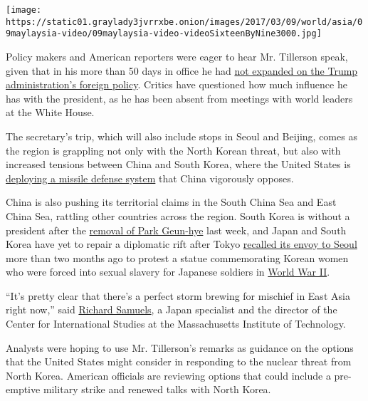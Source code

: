 \texttt{[image: https://static01.graylady3jvrrxbe.onion/images/2017/03/09/world/asia/09maylaysia-video/09maylaysia-video-videoSixteenByNine3000.jpg]}

Policy makers and American reporters were eager to hear Mr. Tillerson
speak, given that in his more than 50 days in office he had
\href{https://www.nytimes3xbfgragh.onion/2017/03/11/us/politics/rex-tillerson-trump-white-house.html?_r=0}{not
expanded on the Trump administration's foreign policy}. Critics have
questioned how much influence he has with the president, as he has been
absent from meetings with world leaders at the White House.

The secretary's trip, which will also include stops in Seoul and
Beijing, comes as the region is grappling not only with the North Korean
threat, but also with increased tensions between China and South Korea,
where the United States is
\href{https://www.nytimes3xbfgragh.onion/2017/03/06/world/asia/north-korea-thaad-missile-defense-us-china.html}{deploying
a missile defense system} that China vigorously opposes.

China is also pushing its territorial claims in the South China Sea and
East China Sea, rattling other countries across the region. South Korea
is without a president after the
\href{https://www.nytimes3xbfgragh.onion/2017/03/09/world/asia/park-geun-hye-impeached-south-korea.html}{removal
of Park Geun-hye} last week, and Japan and South Korea have yet to
repair a diplomatic rift after Tokyo
\href{https://www.nytimes3xbfgragh.onion/2017/01/06/world/asia/japan-south-korea-ambassador-comfort-woman-statue.html}{recalled
its envoy to Seoul} more than two months ago to protest a statue
commemorating Korean women who were forced into sexual slavery for
Japanese soldiers in
\href{http://topics.nytimes3xbfgragh.onion/top/reference/timestopics/subjects/w/world_war_ii_/index.html?inline=nyt-classifier}{World
War II}.

``It's pretty clear that there's a perfect storm brewing for mischief in
East Asia right now,'' said
\href{http://web.mit.edu/polisci/people/faculty/richard-samuels.html}{Richard
Samuels}, a Japan specialist and the director of the Center for
International Studies at the Massachusetts Institute of Technology.

Analysts were hoping to use Mr. Tillerson's remarks as guidance on the
options that the United States might consider in responding to the
nuclear threat from North Korea. American officials are reviewing
options that could include a pre-emptive military strike and renewed
talks with North Korea.


